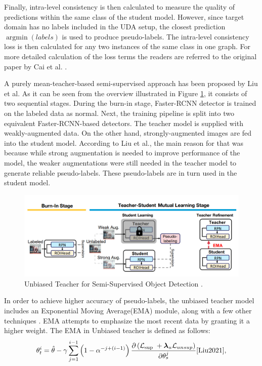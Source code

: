 \documentclass[english, 12pt, a4paper, elec, utf8, a-1b, online]{aaltothesis}
\begin{document}
Finally, intra-level consistency is then calculated to measure the quality of predictions within the same class of the student model. However, since target domain has no labels included in the UDA setup, the closest prediction $\operatorname{argmin} (labels)$ is used to produce pseudo-labels. The intra-level consistency loss is then calculated for any two instances of the same class in one graph. For more detailed calculation of the loss terms the readers are referred to the original paper by Cai et al. \cite{Cai2019}.

A purely mean-teacher-based semi-supervised approach has been proposed by Liu et al. \cite{Liu2021} As it can be seen from the overview illustrated in Figure \ref{unbiased}, it consists of two sequential stages. During the burn-in stage, Faster-RCNN detector is trained on the labeled data as normal. Next, the training pipeline is split into two equivalent Faster-RCNN-based detectors. The teacher model is supplied with weakly-augmented data. On the other hand, strongly-augmented images are fed into the student model. According to Liu et al., the main reason for that was because while strong augmentation is needed to improve performance of the model, the weaker augmentations were still needed in the teacher model to generate reliable pseudo-labels. These pseudo-labels are in turn used in the student model.   
\begin{figure}[htb]
	\begin{center}
		\includegraphics[width=14cm]{./unbiased.png}
	\end{center}
	\caption{Unbiased Teacher for Semi-Supervised Object Detection \cite{Liu2021}.}\label{unbiased}
	\begin{center}
	\end{center}
\end{figure}
\FloatBarrier

In order to achieve higher accuracy of pseudo-labels, the unbiased teacher model includes an Exponential Moving Average(EMA) module, along with a few other techniques \cite{Liu2021}. EMA attempts to emphasize the most recent data by granting it a higher weight. The EMA in Unbiased teacher is defined as follows: 
\begin{equation}
\theta_{t}^{i}=\hat{\theta}-\gamma \sum_{j=1}^{i-1}\left(1-\alpha^{-j+(i-1)}\right) \frac{\partial\left(\mathcal{L}_{\text {sup }}+\boldsymbol{\lambda}_{u} \mathcal{L}_{u n s u p}\right)}{\partial \theta_{s}^{j}}
\label{EMA}
\cite{Liu2021},
\end{equation}
\end{document}
